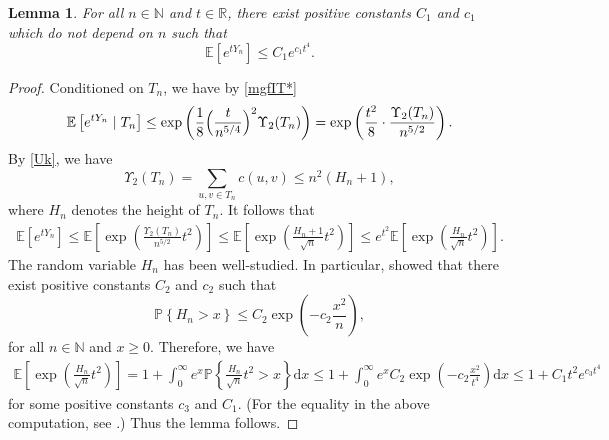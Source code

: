 \documentclass[11pt]{article}
\newcommand{\E}[1]{\mathbb{E} \left[#1\right]}
\def\R{\mathbb{R}}
\def\N{\mathbb{N}}
\def\YY{Y}
\def\U{\Upsilon}
\newcommand\Prob[1]{{\mathbb{P}\left\{#1\right\}}}
\numberwithin{theorem}{section}
\newtheorem{lemma}[theorem]{Lemma}
\theoremstyle{definition}
\numberwithin{equation}{section}
\newcommand\Bigpar[1]{\Bigl(#1\Bigr)}
\newcommand\lrpar[1]{\left(#1\right)}
\begin{document}
\begin{lemma}
    \label{lem:mgflem:gw}
    For all \(n \in \N\) and \(t \in \R\), there exist positive constants \(C_1\) and \(c_1\) which do not
    depend on \(n\) such that
\[
        \E{e^{t\YY_n}} \le C_1 e^{c_1{t^4}}.
    \]
\end{lemma}
\begin{proof}
    Conditioned on \(T_n\), we have by \eqref{mgfIT*}
\begin{align*}
        \E{e^{tY_n}\mid T_n}
        \le
\exp\lrpar{\frac18\Bigpar{\frac{t}{n^{5/4}}}^2\U_2(T_n)}
=
\exp\lrpar{\frac{t^2}8\cdot\frac{\U_2(T_n)}{n^{5/2}}}.
    \end{align*}
    By \eqref{Uk}, we have
    \[
        \U_2(T_n) = \sum_{u, v \in T_n} c(u, v) \le n^2 (H_{n}+1),
    \]
    where \(H_n\) denotes the height of \(T_n\). It follows that
    \begin{align*}
        \E{e^{t\YY_n}}
        \le
        \E{\exp\left( \frac{\U_2(T_n)}{n^{5/2}} t^{2} \right)}
        \le
        \E{\exp\left( \frac{H_n +1}{\sqrt{n}} t^{2} \right)}
        \le
        e^{t^2}
        \E{\exp\left( \frac{ H_n}{\sqrt{n}} t^{2} \right)}
        .
    \end{align*}
    The random variable \(H_n\) has been well-studied. In particular, \citet{adj13} showed that
    there exist positive constants \(C_2\) and \(c_2\) such that
    \[
        \Prob{H_n > x} \le C_{2} \exp\left( -c_2 \frac{x^2}{n} \right),
    \]
    for all \(n \in \N\) and \(x \ge 0\).
    Therefore, we have
    \begin{align*}
        \E{\exp\left( \frac{ H_n}{\sqrt{n}} t^2 \right)}
        =
        1 + 
        \int_{0}^{\infty} e^{x} \Prob{\frac{ H_n}{\sqrt{n}} t^2 > x} \mathrm{d} x
        \le
        1 + 
        \int_{0}^{\infty} e^{x} C_{2} \exp\left( -c_2 \frac{x^2}{t^4} \right) \mathrm{d} x
        \le 1+ C_{1}  t^2 e^{c_3{t^4}}
    \end{align*}
    for some positive constants \(c_3\) and \(C_1\).
    (For the equality in the above computation, see \cite[pp.\ 56]{d10}.)
    Thus the lemma follows.
\end{proof}
\end{document}

